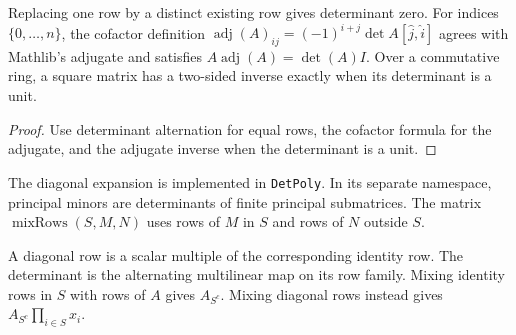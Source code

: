 \begin{lemma}

\label{lem:bach}


\leanok

Replacing one row by a distinct existing row gives determinant zero.
For indices $\{0,\ldots,n\}$, the cofactor definition
$\operatorname{adj}(A)_{ij}=(-1)^{i+j}\det A[\widehat{j},\widehat{i}]$ agrees with Mathlib's
adjugate and satisfies $A\operatorname{adj}(A)=\det(A)I$.
Over a commutative ring, a square matrix has a two-sided inverse exactly when its
determinant is a unit.

\end{lemma}

\begin{proof}

\leanok

Use determinant alternation for equal rows, the cofactor formula for the adjugate,
and the adjugate inverse when the determinant is a unit.

\end{proof}

\begin{definition}

\label{def:diagonal-expansion}


\leanok

The diagonal expansion is implemented in \texttt{DetPoly}.
In its separate namespace, principal minors are determinants of finite principal
submatrices. The matrix $\operatorname{mixRows}(S,M,N)$ uses rows of $M$ in $S$ and
rows of $N$ outside $S$.

\end{definition}

\begin{lemma}

\label{lem:mixed-rows}


\leanok


A diagonal row is a scalar multiple of the corresponding identity row. The determinant
is the alternating multilinear map on its row family. Mixing identity rows in $S$ with
rows of $A$ gives $A_{S^c}$. Mixing diagonal rows instead gives
$A_{S^c}\prod_{i\in S}x_i$.

\end{lemma}

